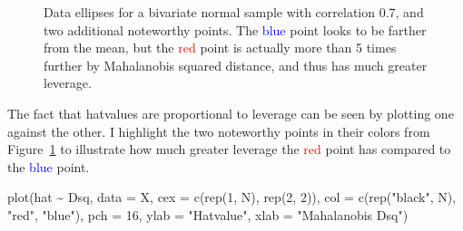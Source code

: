 \documentclass[
  letterpaper,
  10pt,
  krantz2]{krantz}
\makeatletter
\newenvironment{Shaded}{\begin{snugshade}}{\end{snugshade}}
\newcommand{\AttributeTok}[1]{\textcolor[rgb]{0.40,0.45,0.13}{#1}}
\newcommand{\DecValTok}[1]{\textcolor[rgb]{0.68,0.00,0.00}{#1}}
\newcommand{\FunctionTok}[1]{\textcolor[rgb]{0.28,0.35,0.67}{#1}}
\newcommand{\NormalTok}[1]{\textcolor[rgb]{0.00,0.23,0.31}{#1}}
\newcommand{\SpecialCharTok}[1]{\textcolor[rgb]{0.37,0.37,0.37}{#1}}
\newcommand{\StringTok}[1]{\textcolor[rgb]{0.13,0.47,0.30}{#1}}
\newenvironment{kframe}{%
  \medskip{}
  \setlength{\fboxsep}{.8em}
  \def\at@end@of@kframe{}%
  \ifinner\ifhmode%
  \def\at@end@of@kframe{\end{minipage}}%
  \begin{minipage}{\columnwidth}%
  \fi\fi%
  \def\FrameCommand##1{\hskip\@totalleftmargin \hskip-\fboxsep
  \colorbox{shadecolor}{##1}\hskip-\fboxsep
      \hskip-\linewidth \hskip-\@totalleftmargin \hskip\columnwidth}%
  \MakeFramed {\advance\hsize-\width
    \@totalleftmargin\z@ \linewidth\hsize
    \@setminipage}}%
{\par\unskip\endMakeFramed%
  \at@end@of@kframe}
\renewenvironment{Shaded}{\begin{kframe}}{\end{kframe}}
\makeatother
\begin{document}
\begin{figure}[H]


\caption{\label{fig-hatvalues-demo1}Data ellipses for a bivariate normal
sample with correlation 0.7, and two additional noteworthy points. The
\textcolor{blue}{blue} point looks to be farther from the mean, but the
\textcolor{red}{red} point is actually more than 5 times further by
Mahalanobis squared distance, and thus has much greater leverage.}

\end{figure}%

The fact that hatvalues are proportional to leverage can be seen by
plotting one against the other. I highlight the two noteworthy points in
their colors from Figure~\ref{fig-hatvalues-demo1} to illustrate how
much greater leverage the \textcolor{red}{red} point has compared to the
\textcolor{blue}{blue} point.

\begin{Shaded}
\begin{Highlighting}[]
\FunctionTok{plot}\NormalTok{(hat }\SpecialCharTok{\textasciitilde{}}\NormalTok{ Dsq, }\AttributeTok{data =}\NormalTok{ X,}
     \AttributeTok{cex =} \FunctionTok{c}\NormalTok{(}\FunctionTok{rep}\NormalTok{(}\DecValTok{1}\NormalTok{, N), }\FunctionTok{rep}\NormalTok{(}\DecValTok{2}\NormalTok{, }\DecValTok{2}\NormalTok{)), }
     \AttributeTok{col =} \FunctionTok{c}\NormalTok{(}\FunctionTok{rep}\NormalTok{(}\StringTok{"black"}\NormalTok{, N), }\StringTok{"red"}\NormalTok{, }\StringTok{"blue"}\NormalTok{),}
     \AttributeTok{pch =} \DecValTok{16}\NormalTok{,}
     \AttributeTok{ylab =} \StringTok{"Hatvalue"}\NormalTok{,}
     \AttributeTok{xlab =} \StringTok{"Mahalanobis Dsq"}\NormalTok{)}
\end{Highlighting}
\end{Shaded}
\end{document}

